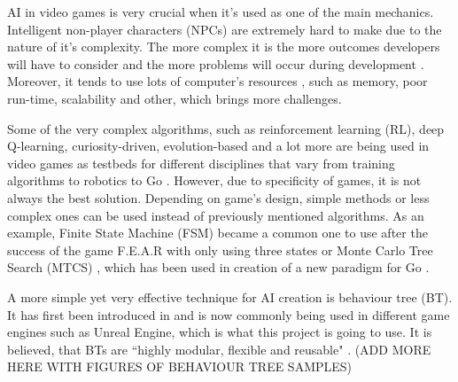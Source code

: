 \documentclass[journal]{IEEEtran}
\begin{document}
AI in video games is very crucial when it's used as one of the main mechanics. Intelligent non-player characters (NPCs) are extremely hard to make due to the nature of it's complexity. The more complex it is the more outcomes developers will have to consider and the more problems will occur during development \cite{gdchalo2}. Moreover, it tends to use lots of computer's resources \cite{gdchalo2}, such as memory, poor run-time, scalability and other, which brings more challenges.

Some of the very complex algorithms, such as reinforcement learning (RL), deep Q-learning, curiosity-driven, evolution-based and a lot more are being used in video games as testbeds for different disciplines that vary from training algorithms \cite{aiinvideogames}\cite{robotplayground} to robotics \cite{schmidhuber2006developmental}\cite{colledanchise2018behavior}\cite{brady1985artificial}\cite{oudeyer2004intelligent} to Go \cite{schaul2011measuring}\cite{alphago}. However, due to specificity of games, it is not always the best solution. Depending on game's design, simple methods or less complex ones can be used instead of previously mentioned algorithms. As an example, Finite State Machine (FSM) became a common one to use after the success of the game F.E.A.R with only using three states \cite{orkin2006three} or Monte Carlo Tree Search (MTCS) \cite{chaslot2008monte}, which has been used in creation of a new paradigm for Go \cite{gelly2011monte}\cite{gelly2012grand}. 

A more simple yet very effective technique for AI creation is behaviour tree (BT). It has first been introduced in \cite{gdchalo2} and is now commonly being used in different game engines such as Unreal Engine, which is what this project is going to use. It is believed, that BTs are ``highly modular, flexible and reusable" \cite{colledanchise2017behavior}. (ADD MORE HERE WITH FIGURES OF BEHAVIOUR TREE SAMPLES)
\end{document}
